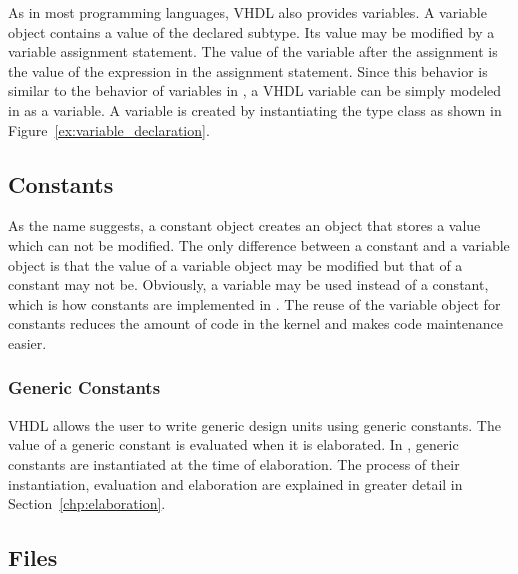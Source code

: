 \documentclass[11pt]{article}
\begin{document}
As in most programming languages, VHDL also provides variables.  A
variable object contains a value of the declared subtype.  Its value
may be modified by a variable assignment statement.  The value of the
variable after the assignment is the value of the expression in the
assignment statement.  Since this behavior is similar to the behavior
of variables in \Cpp\/, a VHDL variable can be simply modeled in
\tyvis\/ as a \Cpp\/ variable.  A variable is created by instantiating
the type class as shown in Figure~\ref{ex:variable_declaration}.


\subsection{Constants}

As the name suggests, a constant object creates an object that stores a
value which can not be modified.  The only difference between a constant
and a variable object is that the value of a variable object may be
modified but that of a constant may not be.  Obviously, a variable may be
used instead of a constant, which is how constants are implemented in
\tyvis.  The reuse of the variable object for constants reduces the amount
of code in the kernel and makes code maintenance easier.

\subsubsection{Generic Constants}

VHDL allows the user to write generic design units using generic constants.
The value of a generic constant is evaluated when it is elaborated.  In
\tyvis, generic constants are instantiated at the time of elaboration.  The
process of their instantiation, evaluation and elaboration are explained in
greater detail in Section~\ref{chp:elaboration}.

\subsection{Files}
\label{sec:files}
\end{document}
